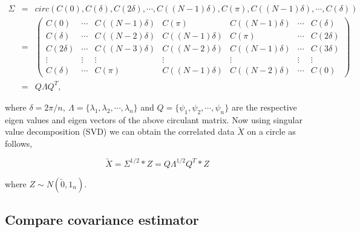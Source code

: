 \begin{eqnarray*}
	\Sigma &=& circ(C(0),C(\delta), C(2\delta), \cdots, C((N-1)\delta), C(\pi),  C((N-1)\delta), \cdots, C(\delta)) \\
	&=& \left(\begin{array}{ccccccc}
	C(0)      & \cdots & C((N-1)\delta ) & C(\pi) &  C((N-1)\delta ) & \cdots & C(\delta) \\
	C(\delta) & \cdots & C((N-2)\delta) & C((N-1)\delta) &  C(\pi)  & \cdots & C(2\delta) \\
	C(2\delta) & \cdots & C((N-3)\delta) & C((N-2)\delta) &  C((N-1)\delta) & \cdots & C(3\delta)\\
	\vdots    & \vdots  & \vdots  & \vdots  & \vdots  & \vdots  & \vdots  \\
	C(\delta) & \cdots & C(\pi) &  C((N-1)\delta) & C((N-2)\delta)  & \cdots & C(0) 
	\end{array} \right) \\
	&=& Q\Lambda Q^T,
\end{eqnarray*}

where $\delta = 2\pi/n,\ \Lambda=\{\lambda_1, \lambda_2,\cdots,\lambda_n\}$ and $Q=\{\psi_1, \psi_2,\cdots,\psi_n\}$ are the respective eigen values and eigen vectors of the above circulant matrix. Now using singular value decomposition (SVD) we can obtain the correlated data $\utilde{X}$ on a circle as follows,

\[
	\utilde{X} = \Sigma^{1/2}*Z = Q\Lambda^{1/2}Q^T*Z 
\]

where $Z\sim N(\utilde{0},1_{n})$.

\subsection{Compare covariance estimator} 

